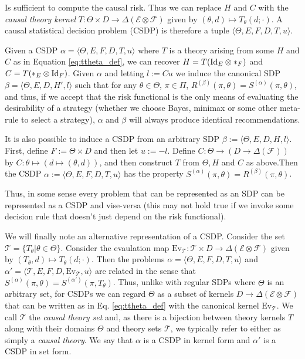 Is sufficient to compute the causal risk.  Thus we can replace $H$ and $C$ with the \emph{causal theory kernel} $T:\Theta\times D\to \Delta(\mathcal{E}\otimes\mathcal{F})$ given by $(\theta,d)\mapsto T_\theta(d;\cdot)$. A causal statistical decision problem (CSDP) is therefore a tuple $\langle \Theta, E, F, D, T, u\rangle$.

Given a CSDP $\alpha = \langle \Theta, E, F, D, T, u\rangle$ where $T$ is a theory arising from some $H$ and $C$ as in Equation \ref{eq:ttheta_def}, we can recover $H= T(\text{Id}_{E}\otimes *_F)$ and $C=T(*_E\otimes \text{Id}_{F})$. Given $\alpha$ and letting $l:= Cu$ we induce the canonical SDP $\beta=\langle \Theta, E, D, H', l\rangle$ such that for any $\theta\in \Theta$, $\pi\in \Pi$, $R^{(\beta)}(\pi,\theta) = S^{(\alpha)}(\pi,\theta)$, and thus, if we accept that the risk functional is the only means of evaluating the desirability of a strategy (whether we choose Bayes, minimax or some other meta-rule to select a strategy), $\alpha$ and $\beta$ will always produce identical recommendations.

It is also possible to induce a CSDP from an arbitrary SDP $\beta:=\langle \Theta, E, D, H, l\rangle$. First, define $F:=\Theta\times D$ and then let $u:=-l$. Define $C:\Theta\to (D\to \Delta(\mathcal{F}))$ by $C:\theta\mapsto (d\mapsto (\theta,d))$, and then construct $T$ from $\Theta, H$ and $C$ as above.Then the CSDP $\alpha:=\langle \Theta, E, F, D, T, u\rangle$ has the property $S^{(\alpha)}(\pi, \theta) = R^{(\beta)}(\pi,\theta)$.

Thus, in some sense every problem that can be represented as an SDP can be represented as a CSDP and vise-versa (this may not hold true if we invoke some decision rule that doesn't just depend on the risk functional).

We will finally note an alternative representation of a CSDP. Consider the set $\mathscr{T} = \{T_\theta|\theta\in \Theta\}$. Consider the evaulation map $\mathrm{Ev}_{\mathscr{T}}:\mathscr{T}\times D\to \Delta(\mathcal{E}\otimes\mathcal{F})$ given by $(T_\theta,d)\mapsto T_\theta(d;\cdot)$. Then the problems $\alpha = \langle \Theta, E, F, D, T, u\rangle$ and $\alpha'=\langle \mathscr{T}, E, F, D, \mathrm{Ev}_{\mathcal{T}}, u\rangle$ are related in the sense that $S^{(\alpha)}(\pi,\theta)=S^{(\alpha')}(\pi,T_\theta)$. Thus, unlike with regular SDPs where $\Theta$ is an arbitrary set, for CSDPs we can regard $\Theta$ as a subset of kernels $D\to \Delta(\mathcal{E}\otimes\mathcal{F})$ that can be written as in Eq. \ref{eq:ttheta_def}  with the canonical kernel $\mathrm{Ev}_{\mathscr{T}}$. We call $\mathscr{T}$ the \emph{causal theory set} and, as there is a bijection between theory kernels $T$ along with their domains $\Theta$ and theory sets $\mathscr{T}$, we typically refer to either as simply a \emph{causal theory}. We say that $\alpha$ is a CSDP in kernel form and $\alpha'$ is a CSDP in set form.